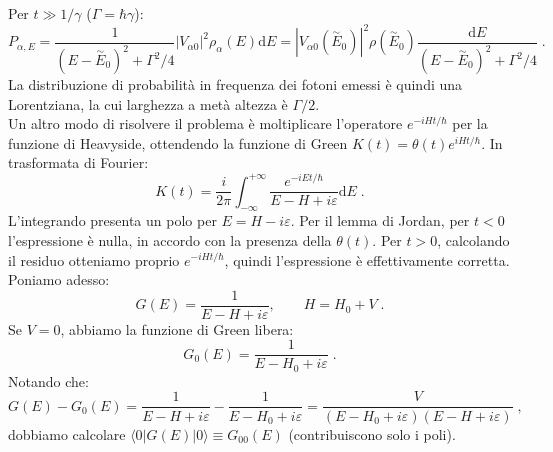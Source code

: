 \documentclass[10pt,a4paper]{report}
\theoremstyle{definition}
\numberwithin{equation}{section}
\newcommand{\diff}[1][]{\mathrm{d}#1}
\newcommand{\bra}{\langle}
\newcommand{\ket}{\rangle}
\begin{document}
Per $t\gg 1/\gamma$ ($\Gamma=\hbar\gamma$):
\begin{equation}
P_{\alpha,E}=\frac{1}{(E-\stackrel{\sim}{E}_0)^2+\Gamma^2/4}|V_{\alpha 0}|^2\rho_{\alpha}(E)\diff{E}=|V_{\alpha 0}(\stackrel{\sim}{E}_0)|^2\rho(\stackrel{\sim}{E}_0)\frac{\diff{E}}{(E-\stackrel{\sim}{E}_0)^2+\Gamma^2/4}\;.
\end{equation}
La distribuzione di probabilità in frequenza dei fotoni emessi è quindi una Lorentziana, la cui larghezza a metà altezza è $\Gamma/2$. \\
Un altro modo di risolvere il problema è moltiplicare l'operatore $e^{-iHt/\hbar}$ per la funzione di Heavyside, ottendendo la funzione di Green $K(t)=\theta(t)e^{iHt/\hbar}$. In trasformata di Fourier:
\begin{equation}
K(t)=\frac{i}{2\pi}\int_{-\infty}^{+\infty}\frac{e^{-iEt/\hbar}}{E-H+i\varepsilon}\diff{E}\;.
\end{equation}
L'integrando presenta un polo per $E=H-i\varepsilon$. Per il lemma di Jordan, per $t<0$ l'espressione è nulla, in accordo con la presenza della $\theta(t)$. Per $t>0$, calcolando il residuo otteniamo proprio $e^{-iHt/\hbar}$, quindi l'espressione è effettivamente corretta. Poniamo adesso:
\begin{equation}
G(E)=\frac{1}{E-H+i\varepsilon},\qquad H=H_0+V\;.
\end{equation}
Se $V=0$, abbiamo la funzione di Green libera:
\begin{equation}
G_0(E)=\frac{1}{E-H_0+i\varepsilon}\;.
\end{equation}
Notando che:
\begin{equation}
G(E)-G_0(E)=\frac{1}{E-H+i\varepsilon}-\frac{1}{E-H_0+i\varepsilon}=\frac{V}{(E-H_0+i\varepsilon)(E-H+i\varepsilon)}\;,
\end{equation}
dobbiamo calcolare $\bra 0|G(E)|0\ket\equiv G_{00}(E)$ (contribuiscono solo i poli).
\end{document}
